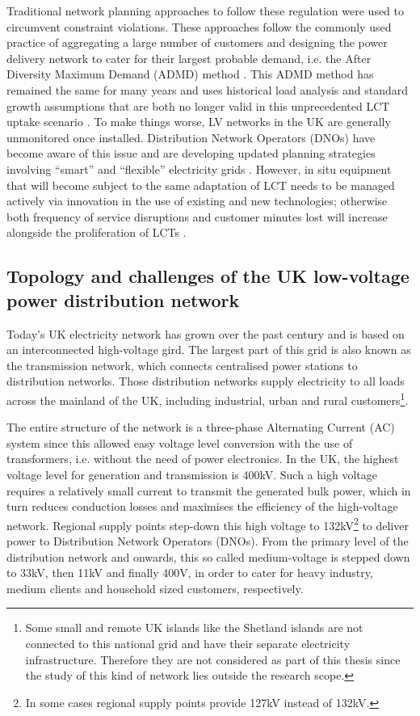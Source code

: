 Traditional network planning approaches to follow these regulation were used to circumvent constraint violations.
These approaches follow the commonly used practice of aggregating a large number of customers and designing the power delivery network to cater for their largest probable demand, i.e. the After Diversity Maximum Demand (ADMD) method \cite{Richardson2010a}.
This ADMD method has remained the same for many years and uses historical load analysis and standard growth assumptions that are both no longer valid in this unprecedented LCT uptake scenario \cite{Yunusov2016}.
To make things worse, LV networks in the UK are generally unmonitored once installed.
Distribution Network Operators (DNOs) have become aware of this issue and are developing updated planning strategies involving ``smart'' and ``flexible'' electricity grids \cite{Fang2012}.
However, in situ equipment that will become subject to the same adaptation of LCT needs to be managed actively via innovation in the use of existing and new technologies; otherwise both frequency of service disruptions and customer minutes lost will increase alongside the proliferation of LCTs \cite{Ault2008a}.


\subsection{Topology and challenges of the UK low-voltage power distribution network}
\label{ch-introduction:subsec:topology-of-lv-network}

Today's UK electricity network has grown over the past century and is based on an interconnected high-voltage gird.
The largest part of this grid is also known as the transmission network, which connects centralised power stations to distribution networks.
Those distribution networks supply electricity to all loads across the mainland of the UK, including industrial, urban and rural customers\footnote[1]{Some small and remote UK islands like the Shetland islands are not connected to this national grid and have their separate electricity infrastructure. Therefore they are not considered as part of this thesis since the study of this kind of network lies outside the research scope.}.

The entire structure of the network is a three-phase Alternating Current (AC) system since this allowed easy voltage level conversion with the use of transformers, i.e. without the need of power electronics.
In the UK, the highest voltage level for generation and transmission is 400kV.
Such a high voltage requires a relatively small current to transmit the generated bulk power, which in turn reduces conduction losses and maximises the efficiency of the high-voltage network.
Regional supply points step-down this high voltage to 132kV\footnote[1]{In some cases regional supply points provide 127kV instead of 132kV.} to deliver power to Distribution Network Operators (DNOs).
From the primary level of the distribution network and onwards, this so called medium-voltage is stepped down to 33kV, then 11kV and finally 400V, in order to cater for heavy industry, medium clients and household sized customers, respectively.

